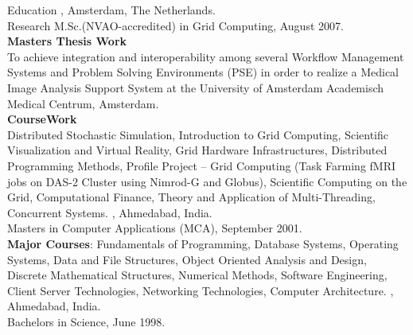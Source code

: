 \documentclass{resume}
\begin{document}
\begin{category}{Education}
, Amsterdam, The Netherlands.\\
Research M.Sc.(NVAO-accredited) in Grid Computing, August 2007.\\
\textbf{Masters Thesis Work}\\
To achieve integration and interoperability among several Workflow Management Systems and Problem Solving Environments (PSE) in order to realize a Medical Image Analysis Support System at the University of Amsterdam Academisch Medical Centrum, Amsterdam.\\
\textbf{CourseWork}\\
Distributed Stochastic Simulation, Introduction to Grid Computing, Scientific Visualization and Virtual Reality, Grid Hardware Infrastructures, Distributed Programming Methods, Profile Project -- Grid Computing (Task Farming fMRI jobs on DAS-2 Cluster using Nimrod-G and Globus), Scientific Computing on the Grid, Computational Finance, Theory and Application of Multi-Threading, Concurrent Systems.
, Ahmedabad, India.\\
Masters in Computer Applications (MCA), September 2001.\\
\textbf{Major Courses}: Fundamentals of Programming, Database Systems, Operating Systems, Data and File Structures, Object Oriented Analysis and Design, Discrete Mathematical Structures, Numerical Methods, Software Engineering, Client Server Technologies, Networking Technologies, Computer Architecture.
, Ahmedabad, India.\\
Bachelors in Science, June 1998.
\end{category}


\renewcommand\refname{Selected Publications}

\nocite{*}
% 
\end{document}

